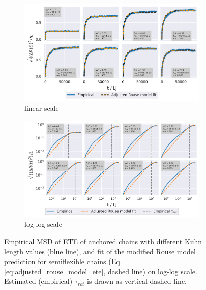 \documentclass[
    paper=A4,pagesize=automedia,fontsize=12pt,
    BCOR=15mm,DIV=22,
    twoside,headinclude,footinclude=false,
    fleqn,             %
    bibliography=totocnumbered,          %
    listof=totoc,                %
    listof=flat,                 %
    cleardoublepage=empty      %
    numbers=endperiod
]{scrartcl}
\begin{document}
\begin{figure}
    \centering
    \begin{subfigure}[b]{\textwidth}
        \centering
        \includegraphics[width=\textwidth]{4-exp-delta_R-rouse_fit-tau-a.png}
        \caption{linear scale}
        \label{fig:msd_anchored_l_K_rouse_fit_tau-a_normal}
    \end{subfigure}
    \begin{subfigure}[b]{\textwidth}
        \centering
        \includegraphics[width=\textwidth]{4-exp-delta_R-rouse_fit-tau-a_log.png}
        \caption{log-log scale}
        \label{fig:msd_anchored_l_K_rouse_fit_tau-a_log}
    \end{subfigure}
    \caption{Empirical MSD of ETE of anchored chains with different Kuhn length values 
    (blue line),
    and fit of the modified Rouse model prediction for semiflexible chains 
    (Eq.\ref{eq:adjusted_rouse_model_ete}, dashed line) on log-log scale.
    Estimated (empirical) $\tau_{rot}$ is drawn as vertical dashed line.}
    \label{fig:msd_anchored_l_K_rouse_fit_tau-a}
\end{figure}
\end{document}
